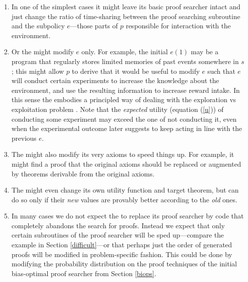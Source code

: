 \begin{enumerate}
\item
   In one of the simplest cases
   it might leave its basic proof searcher intact
   and just change the ratio of time-sharing between
   the proof searching subroutine and the
   subpolicy $e$---those parts of $p$
   responsible for interaction with the environment.
    
\item
    Or the \gm might modify $e$ only.
    For example, the initial $e(1)$ may be a program
    that regularly stores limited memories
    of past events somewhere in $s$; this might allow $p$ to derive that
    it would be useful to modify $e$ such that $e$ will conduct certain
    experiments to increase the knowledge about
    the environment, and use the resulting information
    to increase reward intake.  In this sense the \gm embodies
    a principled way of dealing with the
    exploration vs exploitation problem \cite{Kaelbling:96}.
    Note that the {\em expected} utility (equation (\ref{u}))
    of conducting some experiment may  exceed
    the one of not conducting it,
    even when the experimental outcome later suggests to
    keep acting in line with the previous $e$.



\item
The \gm might also modify its very axioms
to speed things up. For example,
it might find a proof that the
original axioms should be replaced or
augmented by theorems derivable
from the original axioms.
 
\item
 The \gm might even change
 its own utility function and target theorem,
 but can do so only if their {\em new} values
 are provably better according to the {\em old} ones.
  
\item
  In many cases we do not expect
  the \gm to replace its proof searcher by
  code that completely abandons the search for proofs.
  Instead we expect that only certain subroutines
  of the proof searcher will be sped up---compare the
  example in Section \ref{difficult}---or that perhaps just
  the order of generated proofs will be
  modified in problem-specific fashion. This could be done
  by modifying
  the probability distribution on the proof techniques of
  the initial bias-optimal proof searcher
  from Section \ref{biops}.


\end{enumerate}
